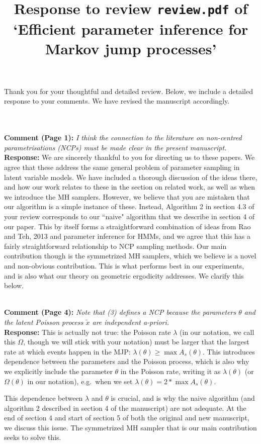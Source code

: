 \documentclass[11pt]{article}
\title{Response to review {\texttt{review.pdf}} of `Efficient parameter inference for Markov jump processes'}
\author{}
\date{}
\newcommand{\rev}[2]{\textbf{Comment #1: }\emph{#2}}
\newcommand{\resp}{\textbf{Response: }}
\begin{document}
\maketitle

Thank you for your thoughtful and detailed review. Below, we include a detailed response to your comments. We have revised the manuscript accordingly. 

~\\~\\
\rev{(Page 1)}{I think the connection to the literature on non-centred parametrisations (NCPs) must be made clear in the present manuscript.}\\ 
\resp 
We are sincerely thankful to you for directing us to these papers. We agree that these address the same general problem of parameter sampling in latent variable models. 
We have included a thorough discussion of the ideas there, and how our work relates to these in the section on related work, as well as when we introduce the MH samplers.
However, we believe that you are mistaken that our algorithm is a simple instance of these. 
Instead, Algorithm 2 in section 4.3 of your review corresponds to our ``naive" algorithm that we describe in section 4 of our paper. 
This by itself forms a straightforward combination of ideas from Rao and Teh, 2013 and parameter inference for HMMs, and we agree that this has a fairly straightforward relationship to NCP sampling methods. 
Our main contribution though is the symmetrized MH samplers, which we believe is a novel and non-obvious contribution. This is what performs best in our experiments, and is also what our theory on geometric ergodicity addresses. We clarify this below.

~\\
\rev{(Page 4)}{Note that (3) defines a NCP because the parameters $\theta$ and the latent Poisson process $\tilde{x}$ are independent a-priori.}\\
\resp{This is actually not true: the Poisson rate $\lambda$ (in our notation, we call this $\Omega$, though we will stick with your notation) must be larger that the largest rate at which events happen in the MJP: 
  $\lambda(\theta) \ge \max A_s(\theta)$. 
  This introduces dependence between the parameters and the Poisson process, which is also why we explicitly include the parameter $\theta$ in the Poisson rate, writing it as $\lambda(\theta)$ (or $\Omega(\theta)$ in our notation), e.g.\ when we set 
$\lambda(\theta) = 2 * \max A_s(\theta)$.}

This dependence between $\lambda$ and $\theta$ is crucial, and is why the naive algorithm (and algorithm 2 described in section 4 of the manuscript) are not adequate. At the end of section 4 and start of section 5 of both the original and new manuscript, we discuss this issue.
The symmetrized MH sampler that is our main contribution seeks to solve this.
\end{document}
